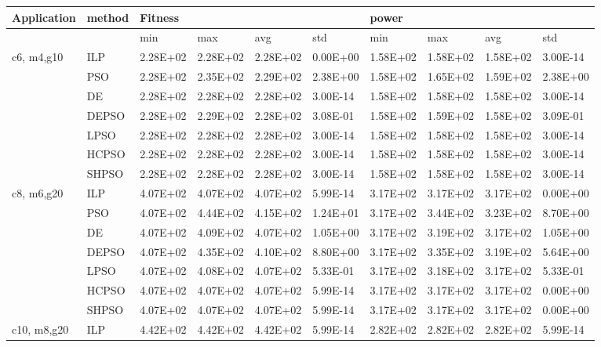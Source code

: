 \begin{adjustbox}{angle=90}
\small

\begin{tabular}{@{}llllllllll@{}}
\toprule
Application & method & Fitness &  &  &  & power &  &  &  \\ \midrule
 &  & min & max & avg & std & min & max & avg & std \\
c6, m4,g10 & ILP & 2.28E+02 & 2.28E+02 & 2.28E+02 & 0.00E+00 & 1.58E+02 & 1.58E+02 & 1.58E+02 & 3.00E-14 \\
 & PSO & 2.28E+02 & 2.35E+02 & 2.29E+02 & 2.38E+00 & 1.58E+02 & 1.65E+02 & 1.59E+02 & 2.38E+00 \\
 & DE & 2.28E+02 & 2.28E+02 & 2.28E+02 & 3.00E-14 & 1.58E+02 & 1.58E+02 & 1.58E+02 & 3.00E-14 \\
 & DEPSO & 2.28E+02 & 2.29E+02 & 2.28E+02 & 3.08E-01 & 1.58E+02 & 1.59E+02 & 1.58E+02 & 3.09E-01 \\
 & LPSO & 2.28E+02 & 2.28E+02 & 2.28E+02 & 3.00E-14 & 1.58E+02 & 1.58E+02 & 1.58E+02 & 3.00E-14 \\
 & HCPSO & 2.28E+02 & 2.28E+02 & 2.28E+02 & 3.00E-14 & 1.58E+02 & 1.58E+02 & 1.58E+02 & 3.00E-14 \\
 & SHPSO & 2.28E+02 & 2.28E+02 & 2.28E+02 & 3.00E-14 & 1.58E+02 & 1.58E+02 & 1.58E+02 & 3.00E-14 \\
c8, m6,g20 & ILP & 4.07E+02 & 4.07E+02 & 4.07E+02 & 5.99E-14 & 3.17E+02 & 3.17E+02 & 3.17E+02 & 0.00E+00 \\
 & PSO & 4.07E+02 & 4.44E+02 & 4.15E+02 & 1.24E+01 & 3.17E+02 & 3.44E+02 & 3.23E+02 & 8.70E+00 \\
 & DE & 4.07E+02 & 4.09E+02 & 4.07E+02 & 1.05E+00 & 3.17E+02 & 3.19E+02 & 3.17E+02 & 1.05E+00 \\
 & DEPSO & 4.07E+02 & 4.35E+02 & 4.10E+02 & 8.80E+00 & 3.17E+02 & 3.35E+02 & 3.19E+02 & 5.64E+00 \\
 & LPSO & 4.07E+02 & 4.08E+02 & 4.07E+02 & 5.33E-01 & 3.17E+02 & 3.18E+02 & 3.17E+02 & 5.33E-01 \\
 & HCPSO & 4.07E+02 & 4.07E+02 & 4.07E+02 & 5.99E-14 & 3.17E+02 & 3.17E+02 & 3.17E+02 & 0.00E+00 \\
 & SHPSO & 4.07E+02 & 4.07E+02 & 4.07E+02 & 5.99E-14 & 3.17E+02 & 3.17E+02 & 3.17E+02 & 0.00E+00 \\
c10, m8,g20 & ILP & 4.42E+02 & 4.42E+02 & 4.42E+02 & 5.99E-14 & 2.82E+02 & 2.82E+02 & 2.82E+02 & 5.99E-14 \\

\end{tabular}
\end{adjustbox}
